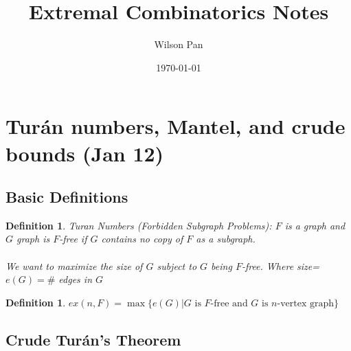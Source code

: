 \documentclass[a4paper]{article}
\title{Extremal Combinatorics Notes}
\author{Wilson Pan}
\date{\today}
\newtheorem{defn}[thm]{Definition}
\begin{document}
\maketitle

\tableofcontents
\newpage
\section{Tur\'an numbers, Mantel, and crude bounds (Jan 12)}

\subsection{Basic Definitions}

\begin{defn}
    Turan Numbers (Forbidden Subgraph Problems): $F$ is a graph and $G$ graph is $F$-free if $G$ contains no copy of $F$ as a subgraph. \\\\
    We want to maximize the size of $G$ subject to $G$ being $F$-free. Where size=$e(G)=\#$ edges in $G$
\end{defn}
\begin{defn}
    $ex(n,F)=\max \{e(G) | G \text{ is $F$-free and $G$ is $n$-vertex graph}\} $
\end{defn}

\subsection{Crude Turán's Theorem}
\end{document}
